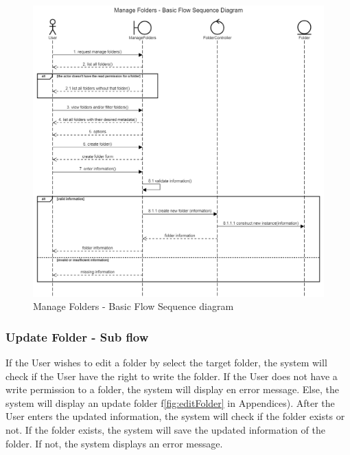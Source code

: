 \begin{figure}[H]
    \centering
    \includegraphics[width=1.0\textwidth]{images/Manage Folders - Basic Flow Sequence Diagram.png}
    \caption{Manage Folders - Basic Flow Sequence diagram}
    \label{fig:SeqFoldersBasic}
\end{figure}

\subsubsection{Update Folder - Sub flow}
If the User wishes to edit a folder by select the target folder, the system will check if the User have the right to write the folder. If the User does not have a write permission to a folder, the system will display en error message. Else, the system will display an update folder f\ref{fig:editFolder} in Appendices). After the User enters the updated information, the system will check if the folder exists or not. If the folder exists, the system will save the updated information of the folder. If not, the system displays an error message. 

